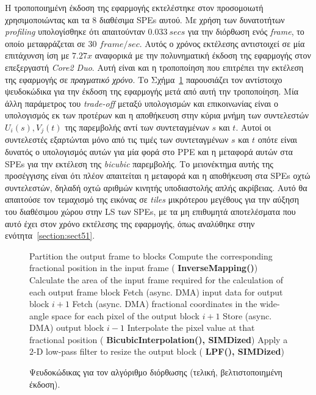 Η τροποποιημένη έκδοση της εφαρμογής εκτελέστηκε στον προσομοιωτή χρησιμοποιώντας και τα \(8\) διαθέσιμα \acp{SPE} αυτού. Με χρήση των δυνατοτήτων \textsl{profiling} υπολογίσθηκε ότι απαιτούνταν \(0.033\ secs\) για την διόρθωση ενός \textsl{frame}, το οποίο μεταφράζεται σε \(30\) \(frame/sec\). Αυτός ο χρόνος εκτέλεσης αντιστοιχεί σε μία επιτάχυνση ίση με \(7.27x\) αναφορικά με την πολυνηματική έκδοση της εφαρμογής στον επεξεργαστή \textsl{Core2 Duo}. Αυτή είναι και η τροποποίηση που επιτρέπει την εκτέλεση της εφαρμογής σε \textsl{πραγματικό χρόνο}. Το Σχήμα~\ref{figure:fig52} παρουσιάζει τον αντίστοιχο ψευδοκώδικα για την έκδοση της εφαρμογής μετά από αυτή την τροποποίηση.\newline \indent
Μία άλλη παράμετρος του \textsl{trade-off} μεταξύ υπολογισμών και επικοινωνίας είναι ο υπολογισμός εκ των προτέρων και η αποθήκευση στην κύρια μνήμη των συντελεστών \(U_{i}(s), V_{j}(t)\) της παρεμβολής αντί των συντεταγμένων \(s\) και \(t\). Αυτοί οι συντελεστές εξαρτώνται μόνο από τις τιμές των συντεταγμένων \(s\) και \(t\) οπότε είναι δυνατός ο υπολογισμός αυτών για μία φορά στο \ac{PPE} και η μεταφορά αυτών στα \acp{SPE} για την εκτέλεση της \textsl{bicubic} παρεμβολής. Το μειονέκτημα αυτής της προσέγγισης είναι ότι πλέον απαιτείται η μεταφορά και η αποθήκευση στα \acp{SPE} οχτώ συντελεστών, δηλαδή οχτώ αριθμών κινητής υποδιαστολής απλής ακρίβειας. Αυτό θα απαιτούσε τον τεμαχισμό της εικόνας σε \textsl{tiles} μικρότερου μεγέθους για την αύξηση του διαθέσιμου χώρου στην \ac{LS} των \acp{SPE}, με τα μη επιθυμητά αποτελέσματα που αυτό έχει στον χρόνο εκτέλεσης της εφαρμογής, όπως αναλύθηκε στην ενότητα~\ref{section:sect51}.
\begin{figure}
\centering
\begin{small}
\begin{algorithmic}[1]
\STATE {}
\STATE {}
\STATE Partition the output frame to blocks
			\STATE Compute the corresponding fractional position in the input frame ({\textbf{ InverseMapping()}})
		\ENDFOR
		\STATE Calculate the area of the input frame required for the calculation of each output frame block
	\ENDIF
	\STATE {}
		\STATE Fetch (async. DMA) input data for output block $i+1$
		\STATE Fetch (async. DMA) fractional coordinates in the wide-angle space for each pixel of the output block $i+1$
		\STATE Store (async. DMA) output block $i-1$
			\STATE Interpolate the pixel value at that fractional position ({\textbf{ BicubicInterpolation(), SIMDized}})
		\ENDFOR
		\STATE Apply a $2$-D low-pass filter to resize the output block ({\textbf{ LPF(), SIMDized}})
	\ENDFOR
\ENDFOR
\end{algorithmic}
\end{small}
\caption{\label{figure:fig52} Ψευδοκώδικας για τον αλγόριθμο διόρθωσης (τελική, βελτιστοποιημένη έκδοση).}
\end{figure}
